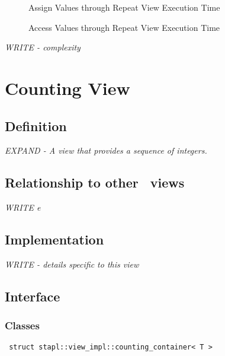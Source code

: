\begin{figure}[p]
\caption{Assign Values through Repeat View Execution Time}
\label{fig:rep-vw-assign-exper}
\end{figure}

\begin{figure}[p]
\caption{Access Values through Repeat View Execution Time}
\label{fig:rep-vw-access-exper}
\end{figure}

\emph{WRITE - complexity}


\section{Counting View} \label{sec-cnt-vw}

\subsection{Definition}

\textit{EXPAND - A view that provides a sequence of integers.}

\subsection{Relationship to other \stapl\ views}

\textit{WRITE e}

\subsection{Implementation}

\textit{WRITE - details specific to this view}

\subsection{Interface} \label{sec-cnt-vw-inter}

\subsubsection{Classes}

\noindent
\texttt{%
struct stapl::view\_impl::counting\_container< T >
}

